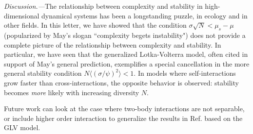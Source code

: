 \emph{Discussion.---}The relationship between complexity and stability in high-dimensional dynamical systems has been a longstanding puzzle, in ecology and in other fields. 
In this letter, we have showed that the condition $\sigma\sqrt{N}< \mu_s - \mu$ (popularized by May's slogan ``complexity begets instability") does not provide a complete picture of the relationship between complexity and stability. 
In particular, we have seen that the generalized Lotka-Volterra model, often cited in support of May's general prediction, exemplifies a special cancellation in the more general stability condition $N\langle (\sigma/\psi)^2\rangle < 1$.
In models where self-interactions grow faster than cross-interactions, the opposite behavior is observed: stability becomes \emph{more} likely with increasing diversity $N$.

Future work can look at the case where two-body interactions are not separable, or include higher order interaction to generalize the results in Ref. \cite{Gibbs2022} based on the GLV model. 